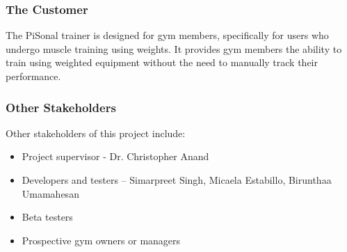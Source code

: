 \documentclass{article}
\begin{document}
\subsubsection{The Customer}
The PiSonal trainer is designed for gym members, specifically for users who undergo muscle training using weights. It provides gym members the ability to train using weighted equipment without the need to manually track their performance. 

\subsubsection{Other Stakeholders}
Other stakeholders of this project include:
\begin{itemize}
    \item Project supervisor - Dr. Christopher Anand
    \item Developers and testers – Simarpreet Singh, Micaela Estabillo, Birunthaa Umamahesan
    \item Beta testers
    \item Prospective gym owners or managers
\end{itemize}
\end{document}
